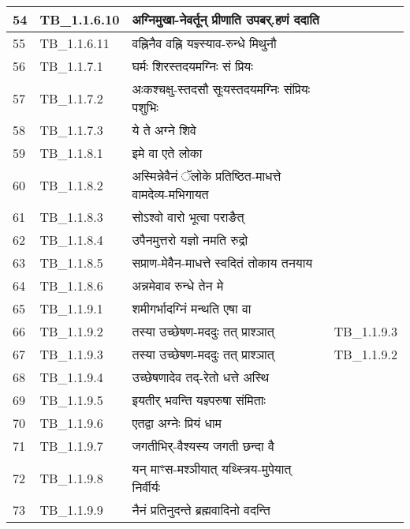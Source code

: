 \documentclass[17pt]{extarticle}
\begin{document}
\begin{longtable}{||p{0.4in}||p{0.9in}||p{4.0in}||p{0.9in}||}
        \hline
            54 & TB\_1.1.6.10 & अग्निमुखा{-}नेवर्तून् प्रीणाति उपबर्.हणं ददाति &      \\
        \hline
            55 & TB\_1.1.6.11 & वह्निनैव वह्नि यज्ञ्स्याव{-}रुन्धे मिथुनौ &      \\
        \hline
            56 & TB\_1.1.7.1 & घर्मः शिरस्तदयमग्निः सं प्रियः &      \\
        \hline
            57 & TB\_1.1.7.2 & अःकश्चक्षु{-}स्तदसौ सूःयस्तदयमग्निः संप्रियः पशुभिः &      \\
        \hline
            58 & TB\_1.1.7.3 & ये ते अग्ने शिवे &      \\
        \hline
            59 & TB\_1.1.8.1 & इमे वा एते लोका &      \\
        \hline
            60 & TB\_1.1.8.2 & अस्मिन्नेवैनं ॅलोके प्रतिष्ठित{-}माधत्ते वामदेव्य{-}मभिगायत &      \\
        \hline
            61 & TB\_1.1.8.3 & सोऽश्वो वारो भूत्वा पराङैत् &      \\
        \hline
            62 & TB\_1.1.8.4 & उपैनमुत्तरो यज्ञो नमति रुद्रो &      \\
        \hline
            63 & TB\_1.1.8.5 & सप्राण{-}मेवैन{-}माधत्ते स्वदितं तोकाय तनयाय &      \\
        \hline
            64 & TB\_1.1.8.6 & अन्नमेवाव रुन्धे तेन मे &      \\
        \hline
            65 & TB\_1.1.9.1 & शमीगर्भादग्निं मन्थति एषा वा &      \\
        \hline
            66 & TB\_1.1.9.2 & तस्या उच्छेषण{-}मददुः तत् प्राश्ञात् &  TB\_1.1.9.3       \\
        \hline
            67 & TB\_1.1.9.3 & तस्या उच्छेषण{-}मददुः तत् प्राश्ञात् & TB\_1.1.9.2        \\
        \hline
            68 & TB\_1.1.9.4 & उच्छेषणादेव तद्{-}रेतो धत्ते अस्थि &      \\
        \hline
            69 & TB\_1.1.9.5 & इयतीर् भवन्ति यज्ञ्परुषा संमिताः &      \\
        \hline
            70 & TB\_1.1.9.6 & एतद्वा अग्नेः प्रियं धाम &      \\
        \hline
            71 & TB\_1.1.9.7 & जगतीभिर्{-}वैश्यस्य जगती छन्दा वै &      \\
        \hline
            72 & TB\_1.1.9.8 & यन् माꣳस{-}मश्ञीयात् यथ्स्त्रिय{-}मुपेयात् निर्वीर्यः &      \\
        \hline
            73 & TB\_1.1.9.9 & नैनं प्रतिनुदन्ते ब्रह्मवादिनो वदन्ति &      \\

\end{longtable}
\end{document}
